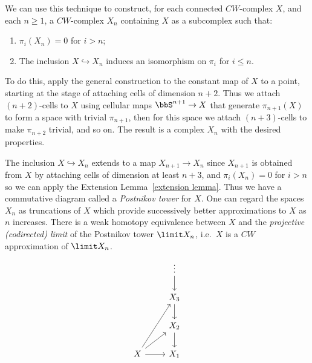 \begin{example}
    We can use this technique to construct, for each connected $CW$-complex $X$, and each $n\geq 1$, a $CW$-complex $X_n$ containing $X$ as a subcomplex such that:
    \begin{enumerate}[label=(\alph*)]
        \item $\pi_i(X_n)=0$ for $i>n$;
        \item The inclusion $X\hookrightarrow X_n$ induces an isomorphism on $\pi_i$ for $i\leq n$.
    \end{enumerate}
    To do this, apply the general construction to the constant map of $X$ to a point, starting at the stage of attaching cells of dimension $n+2$. Thus we attach $(n+2)$-cells to $X$ using cellular maps $\bbS^{n+1}\to X$ that generate $\pi_{n+1}(X)$ to form a space with trivial $\pi_{n+1}$, then for this space we attach $(n+3)$-cells to make $\pi_{n+2}$ trivial, and so on. The result is a complex $X_n$ with the desired properties.

    The inclusion $X\hookrightarrow X_n$ extends to a map $X_{n+1}\to X_n$ since $X_{n+1}$ is obtained from $X$ by attaching cells of dimension at least $n+3$, and $\pi_i(X_n)=0$ for $i>n$ so we can apply the Extension Lemma~\ref{extension lemma}. Thus we have a commutative diagram called a \emph{Postnikov tower} for $X$. One can regard the spaces $X_n$ as truncations of $X$ which provide successively better approximations to $X$ as $n$ increases. There is a weak homotopy equivalence between $X$ and the \emph{projective (codirected) limit} of the Postnikov tower $\limit X_n$, i.e.~$X$ is a $CW$ approximation of $\limit X_n$.
    \[
    \begin{tikzcd}[every matrix/.append style={name=m}]
       & \vdots \arrow[d]\\
       & X_3 \arrow[d]\\
       & X_2 \arrow[d]\\
       X\arrow[r]\arrow[ur]\arrow[uur] & X_1
    \end{tikzcd}
    \]
\end{example}


